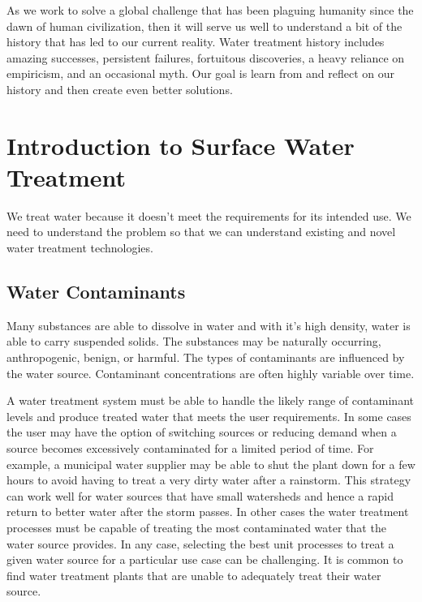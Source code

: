\documentclass[letterpaper,10pt,english]{sphinxmanual}
\begin{document}
As we work to solve a global challenge that has been plaguing humanity since the dawn of human civilization, then it will serve us well to understand a bit of the history that has led to our current reality. Water treatment history includes amazing successes, persistent failures, fortuitous discoveries, a heavy reliance on empiricism, and an occasional myth. Our goal is learn from and reflect on our history and then create even better solutions.


\section{Introduction to Surface Water Treatment}
\label{\detokenize{Introduction/Introduction:introduction-to-surface-water-treatment}}\label{\detokenize{Introduction/Introduction:heading-introduction-to-surface-water-treatment}}
We treat water because it doesn’t meet the requirements for its intended use. We need to understand the problem so that we can understand existing and novel water treatment technologies.


\subsection{Water Contaminants}
\label{\detokenize{Introduction/Introduction:water-contaminants}}\label{\detokenize{Introduction/Introduction:heading-water-contaminants}}
Many substances are able to dissolve in water and with it’s high density, water is able to carry suspended solids. The substances may be naturally occurring, anthropogenic, benign, or harmful. The types of contaminants are influenced by the water source. Contaminant concentrations are often highly variable over time.

A water treatment system must be able to handle the likely range of contaminant levels and produce treated water that meets the user requirements. In some cases the user may have the option of switching sources or reducing demand when a source becomes excessively contaminated for a limited period of time. For example, a municipal water supplier may be able to shut the plant down for a few hours to avoid having to treat a very dirty water after a rainstorm. This strategy can work well for water sources that have small watersheds and hence a rapid return to better water after the storm passes. In other cases the water treatment processes must be capable of treating the most contaminated water that the water source provides. In any case, selecting the best unit processes to treat a given water source for a particular use case can be challenging. It is common to find water treatment plants that are unable to adequately treat their water source.
\end{document}
